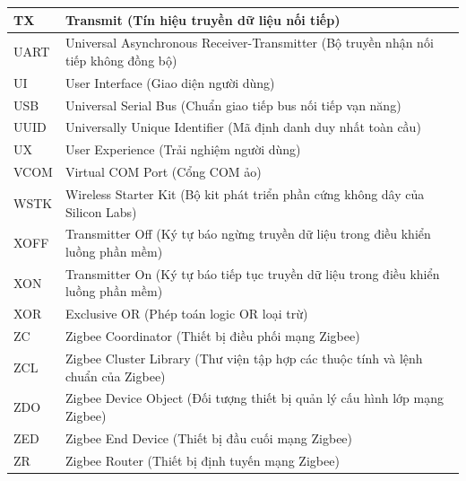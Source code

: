 \begin{longtable}{|l|p{12cm}|}
TX & Transmit (Tín hiệu truyền dữ liệu nối tiếp) \\ \hline
UART & Universal Asynchronous Receiver-Transmitter (Bộ truyền nhận nối tiếp không đồng bộ) \\ \hline
UI & User Interface (Giao diện người dùng) \\ \hline
USB & Universal Serial Bus (Chuẩn giao tiếp bus nối tiếp vạn năng) \\ \hline
UUID & Universally Unique Identifier (Mã định danh duy nhất toàn cầu) \\ \hline
UX & User Experience (Trải nghiệm người dùng) \\ \hline
VCOM & Virtual COM Port (Cổng COM ảo) \\ \hline
WSTK & Wireless Starter Kit (Bộ kit phát triển phần cứng không dây của Silicon Labs) \\ \hline
XOFF & Transmitter Off (Ký tự báo ngừng truyền dữ liệu trong điều khiển luồng phần mềm) \\ \hline
XON & Transmitter On (Ký tự báo tiếp tục truyền dữ liệu trong điều khiển luồng phần mềm) \\ \hline
XOR & Exclusive OR (Phép toán logic OR loại trừ) \\ \hline
ZC & Zigbee Coordinator (Thiết bị điều phối mạng Zigbee) \\ \hline
ZCL & Zigbee Cluster Library (Thư viện tập hợp các thuộc tính và lệnh chuẩn của Zigbee) \\ \hline
ZDO & Zigbee Device Object (Đối tượng thiết bị quản lý cấu hình lớp mạng Zigbee) \\ \hline
ZED & Zigbee End Device (Thiết bị đầu cuối mạng Zigbee) \\ \hline
ZR & Zigbee Router (Thiết bị định tuyến mạng Zigbee) \\ \hline
\end{longtable}
\normalsize

\newpage
